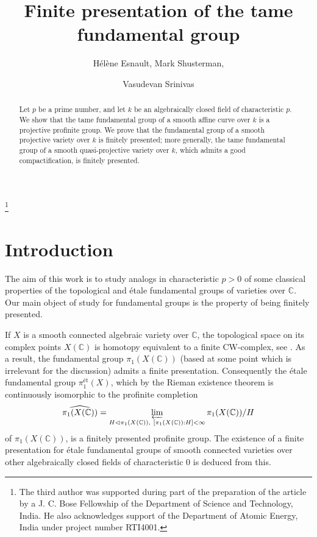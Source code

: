 \documentclass[12pt]{amsart}
\theoremstyle{plain}
\theoremstyle{definition}
\numberwithin{thm}{section}
\newcommand{\C}{{\mathbb C}}
\numberwithin{equation}{section}
\begin{document}
\title[ Finite presentation]{Finite presentation of  the tame fundamental group  }
\author{H\'el\`ene Esnault, Mark Shusterman, \and Vasudevan Srinivas}
\address{Freie Universit\"at Berlin, Arnimallee 3, 14195, Berlin,  Germany}
\address{Harvard University, Mathematics, 1 Oxford Street, Cambridge, MA 02138, USA}
\address{   TIFR, School of Mathematics \\
Homi Bhabha Road \\
400005 Mumbai, India}
\thanks{The third author was supported during part of the preparation of the article by a J. C. Bose Fellowship of the Department of Science and Technology, India. He also acknowledges support of the Department of Atomic Energy, India under project number RTI4001.}

\begin{abstract}  

Let $p$ be a prime number, and let $k$ be an algebraically closed field of characteristic $p$.
We show that the tame fundamental group of a smooth affine curve over $k$ is a projective profinite group.
We prove that the fundamental group of a smooth projective variety over $k$ is finitely presented; more generally, the tame
fundamental group of a smooth quasi-projective variety over $k$, which admits a
good compactification, is finitely presented.


\end{abstract}

 
\maketitle
\section{Introduction} 

The aim of this work is to study analogs  
 in characteristic $p > 0$ of some classical properties of the  topological and \'etale fundamental groups of varieties over $\mathbb{C}$.  Our main object of study for fundamental groups is the property of being finitely presented. 

If  $X$ is a smooth connected algebraic variety  over $\mathbb{C}$, the topological space on its complex points 
 $X(\mathbb{C})$ is   homotopy equivalent to a finite CW-complex, see \cite{Mor78}.
As a result, the fundamental group $\pi_1(X(\C))$ (based at some point which is irrelevant for the discussion) admits a finite presentation.
Consequently the \'{e}tale fundamental group $\pi_1^{\text{\'{e}t}}(X)$, which by the Rieman existence theorem  is continuously isomorphic to the profinite completion 
\begin{equation}
\widehat{\pi_1(X(\C))} = \varprojlim_{\substack{H \lhd \pi_1(X(\C)), \ [\pi_1(X(\C)) : H] < \infty}} \pi_1(X(\C))/H  \notag
\end{equation} 
of $\pi_1(X(\C))$, is a finitely presented profinite group.
The existence of a finite presentation for \'{e}tale fundamental groups of smooth connected varieties over other algebraically closed fields of characteristic $0$ is deduced from this.
\end{document}
